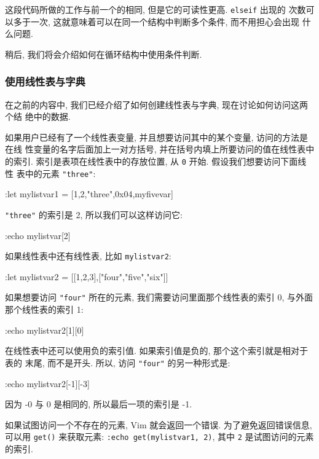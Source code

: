 这段代码所做的工作与前一个的相同, 但是它的可读性更高. \texttt{elseif} 出现的
次数可以多于一次, 这就意味着可以在同一个结构中判断多个条件, 而不用担心会出现
什么问题.

稍后, 我们将会介绍如何在循环结构中使用条件判断.

\subsubsection{使用线性表与字典}
\label{subsubsec:working_with_lists_and_dictionaries}

在之前的内容中, 我们已经介绍了如何创建线性表与字典, 现在讨论如何访问这两个结
绝中的数据.

如果用户已经有了一个线性表变量, 并且想要访问其中的某个变量, 访问的方法是在线
性变量的名字后面加上一对方括号, 并在括号内填上所要访问的值在线性表中的索引.
索引是表项在线性表中的存放位置, 从 \texttt{0} 开始. 假设我们想要访问下面线性
表中的元素 \texttt{"three"}:
\begin{vimcode}
:let mylistvar1 = [1,2,"three",0x04,myfivevar]
\end{vimcode}
\texttt{"three"} 的索引是 2, 所以我们可以这样访问它:
\begin{vimcode}
:echo mylistvar[2]
\end{vimcode}
如果线性表中还有线性表, 比如 \texttt{mylistvar2}:
\begin{vimcode}
    :let mylistvar2 = [[1,2,3],["four","five","six"]]
\end{vimcode}
如果想要访问 \texttt{"four"} 所在的元素, 我们需要访问里面那个线性表的索引 0,
与外面那个线性表的索引 1:
\begin{vimcode}
:echo mylistvar2[1][0]
\end{vimcode}

在线性表中还可以使用负的索引值. 如果索引值是负的, 那个这个索引就是相对于表的
末尾, 而不是开头. 所以, 访问 \texttt{"four"} 的另一种形式是:
\begin{vimcode}
:echo mylistvar2[-1][-3]
\end{vimcode}
因为 -0 与 0 是相同的, 所以最后一项的索引是 -1.

\begin{warning}
    如果试图访问一个不存在的元素, Vim 就会返回一个错误. 为了避免返回错误信息,
    可以用 \texttt{get()} 来获取元素: \texttt{:echo get(mylistvar1, 2)}, 其中
    \texttt{2} 是试图访问的元素的索引.
\end{warning}

